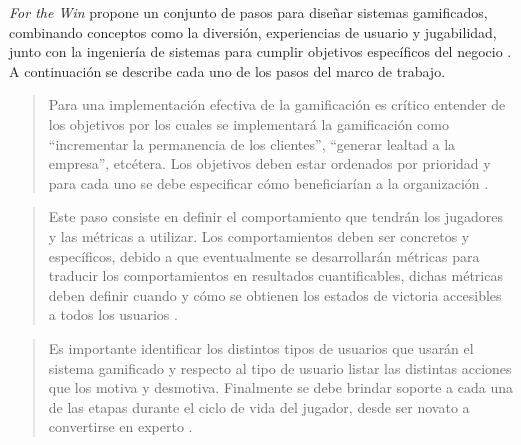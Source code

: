  {\it For the Win} propone un conjunto de pasos para diseñar sistemas gamificados,
 combinando conceptos como la diversión, experiencias de usuario y jugabilidad, junto
 con la ingeniería de sistemas para cumplir objetivos específicos del negocio
 \cite[p. 70]{ForTheWin}. A continuación se describe cada uno de los pasos del marco
 de trabajo.\\


    \begin{quote}
        Para una implementación efectiva de la gamificación es crítico entender de los
        objetivos por los cuales se implementará la gamificación como ``incrementar la
        permanencia de los clientes'', ``generar lealtad a la empresa'', etcétera. Los
        objetivos deben estar ordenados por prioridad y para cada uno se debe
        especificar cómo beneficiarían a la organización \cite[p. 62]{ForTheWin}.
    \end{quote}



    \begin{quote}
        Este paso consiste en definir el comportamiento que tendrán los jugadores y
        las métricas a utilizar. Los comportamientos deben ser concretos y
        específicos, debido a que eventualmente se desarrollarán métricas para
        traducir los comportamientos en resultados cuantificables, dichas métricas
        deben definir cuando y cómo se obtienen los estados de victoria accesibles
        a todos los usuarios \cite[pp. 63-64]{ForTheWin}.
    \end{quote}



    \begin{quote}
        Es importante identificar los distintos tipos de usuarios que usarán el sistema
        gamificado y respecto al tipo de usuario listar las distintas acciones que los
        motiva y desmotiva. Finalmente se debe brindar soporte a cada una de las etapas
        durante el ciclo de vida del jugador, desde ser novato a convertirse en experto
        \cite[pp. 64-65]{ForTheWin}.
    \end{quote}



